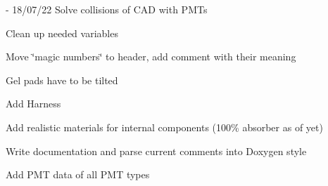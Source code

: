 \begin{DoxyRefList}
\item[File \mbox{\hyperlink{_o_m_sim_l_o_m18_8cc}{OMSim\+LOM18.cc}} ]\label{todo__todo000006}%
%
-\/ 18/07/22 Solve collisions of CAD with PMTs
\begin{DoxyItemize}
\item Clean up needed variables
\item Move \char`\"{}magic numbers\char`\"{} to header, add comment with their meaning
\item Gel pads have to be tilted
\item Add Harness
\item Add realistic materials for internal components (100\% absorber as of yet)
\item Write documentation and parse current comments into Doxygen style  
\end{DoxyItemize}
\item[Member \mbox{\hyperlink{class_o_m_sim_p_m_t_response_a0dd544847ff216a24aa8c528e76c9aed}{OMSim\+PMTResponse\+::create\+Histogram\+From\+Data}} (const std\+::string \&p\+File\+Path, const char $\ast$p\+TH2\+DName)]\label{todo__todo000002}%
%
Add PMT data of all PMT types 
\end{DoxyRefList}